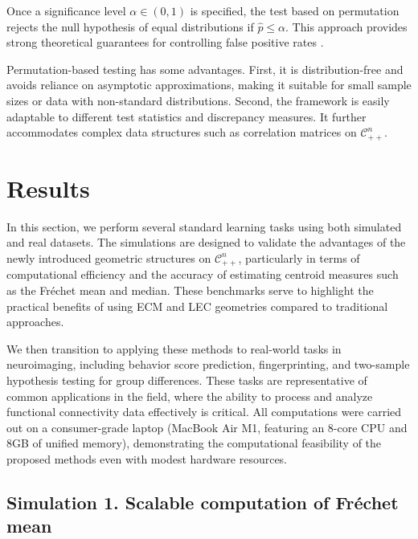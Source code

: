 \documentclass[10pt]{article}
\newcommand{\Frechet}{Fr\'{e}chet }
\newcommand{\CORR}{\mathcal{C}_{++}^n}
\begin{document}
Once a significance level $\alpha \in (0,1)$ is specified, the test based on permutation rejects the null hypothesis of equal distributions if $\hat{p} \leq \alpha$. This approach provides strong theoretical guarantees for controlling false positive rates \citep{romano_2005_ExactApproximateStepdown, you_2022_ComparingMultipleLatent}.


Permutation-based testing has some advantages. First, it is distribution-free and avoids reliance on asymptotic approximations, making it suitable for small sample sizes or data with non-standard distributions. Second, the framework is easily adaptable to different test statistics and discrepancy measures. It further accommodates complex data structures such as correlation matrices on $\CORR$.









\section{Results}\label{sec:examples}

In this section, we perform several standard learning tasks using both simulated and real datasets. The simulations are designed to validate the advantages of the newly introduced geometric structures on $\CORR$, particularly in terms of computational efficiency and the accuracy of estimating centroid measures such as the \Frechet mean and median. These benchmarks serve to highlight the practical benefits of using ECM and LEC geometries compared to traditional approaches.

We then transition to applying these methods to real-world tasks in neuroimaging, including behavior score prediction, fingerprinting, and two-sample hypothesis testing for group differences. These tasks are representative of common applications in the field, where the ability to process and analyze functional connectivity data effectively is critical. All computations were carried out on a consumer-grade laptop (MacBook Air M1, featuring an 8-core CPU and 8GB of unified memory), demonstrating the computational feasibility of the proposed methods even with modest hardware resources.


\subsection{Simulation 1. Scalable computation of \Frechet mean}
\end{document}
